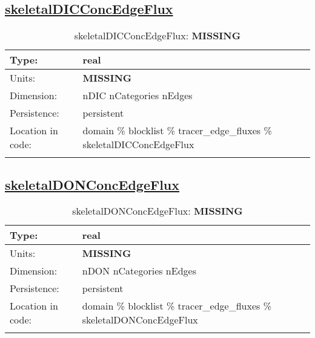 \subsection[skeletalDICConcEdgeFlux]{\hyperref[sec:var_tab_tracer_edge_fluxes]{skeletalDICConcEdgeFlux}}
\label{subsec:var_sec_tracer_edge_fluxes_skeletalDICConcEdgeFlux}
\begin{center}
\begin{longtable}{| p{2.0in} | p{4.0in} |}
        \hline 
        Type: & real \\
        \hline 
        Units: & {\bf \color{red} MISSING} \\
        \hline 
        Dimension: & nDIC nCategories nEdges \\
        \hline 
        Persistence: & persistent \\
        \hline 
         Location in code: & domain \% blocklist \% tracer\_edge\_fluxes \% skeletalDICConcEdgeFlux \\
         \hline 
    \caption{skeletalDICConcEdgeFlux: {\bf \color{red} MISSING}}
\end{longtable}
\end{center}
\subsection[skeletalDONConcEdgeFlux]{\hyperref[sec:var_tab_tracer_edge_fluxes]{skeletalDONConcEdgeFlux}}
\label{subsec:var_sec_tracer_edge_fluxes_skeletalDONConcEdgeFlux}
\begin{center}
\begin{longtable}{| p{2.0in} | p{4.0in} |}
        \hline 
        Type: & real \\
        \hline 
        Units: & {\bf \color{red} MISSING} \\
        \hline 
        Dimension: & nDON nCategories nEdges \\
        \hline 
        Persistence: & persistent \\
        \hline 
         Location in code: & domain \% blocklist \% tracer\_edge\_fluxes \% skeletalDONConcEdgeFlux \\
         \hline 
    \caption{skeletalDONConcEdgeFlux: {\bf \color{red} MISSING}}
\end{longtable}
\end{center}
